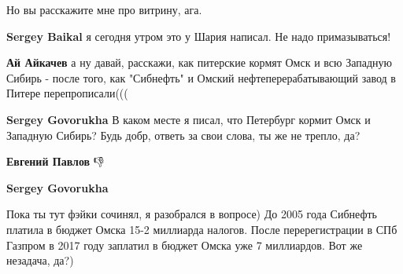 \begin{itemize}
\begin{itemize}
Но вы расскажите мне про витрину, ага.

 
\textbf{Sergey Baikal} я сегодня утром это у Шария написал. Не надо примазываться!

 
\textbf{Ай Айкачев} а ну давай, расскажи, как питерские кормят Омск и всю Западную Сибирь - после того, как "Сибнефть" и Омский нефтеперерабатывающий завод в Питере перепрописали(((

 
\textbf{Sergey Govorukha} В каком месте я писал, что Петербург кормит Омск и Западную Сибирь? Будь добр, ответь за свои слова, ты же не трепло, да?

 
\textbf{Евгений Павлов} 👎

 
\textbf{Sergey Govorukha} 

Пока ты тут фэйки сочинял, я разобрался в вопросе) До 2005 года Сибнефть
платила в бюджет Омска 15-2 миллиарда налогов. После перерегистрации в СПб
Газпром в 2017 году заплатил в бюджет Омска уже 7 миллиардов. Вот же незадача,
да?)

 

\end{itemize}
\end{itemize}
